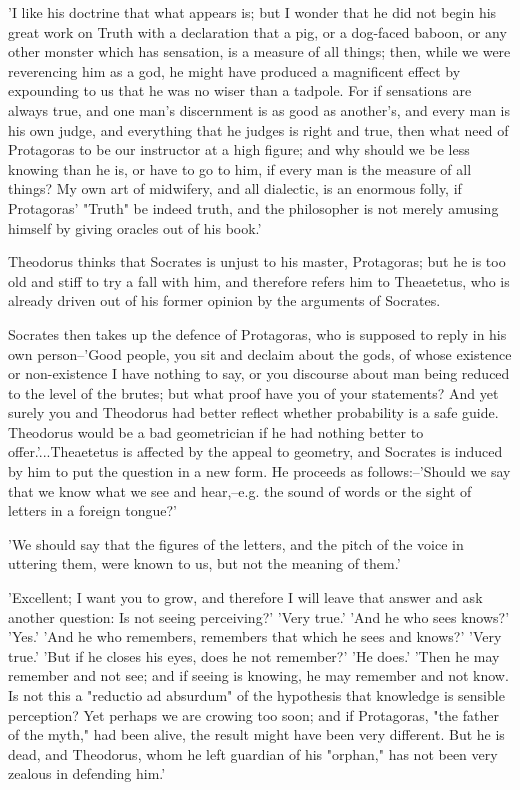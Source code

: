 'I like his doctrine that what appears is; but I wonder that he did
not begin his great work on Truth with a declaration that a pig, or a
dog-faced baboon, or any other monster which has sensation, is a measure
of all things; then, while we were reverencing him as a god, he might
have produced a magnificent effect by expounding to us that he was no
wiser than a tadpole. For if sensations are always true, and one man's
discernment is as good as another's, and every man is his own judge,
and everything that he judges is right and true, then what need of
Protagoras to be our instructor at a high figure; and why should we
be less knowing than he is, or have to go to him, if every man is the
measure of all things? My own art of midwifery, and all dialectic, is
an enormous folly, if Protagoras' "Truth" be indeed truth, and the
philosopher is not merely amusing himself by giving oracles out of his
book.'

Theodorus thinks that Socrates is unjust to his master, Protagoras; but
he is too old and stiff to try a fall with him, and therefore refers him
to Theaetetus, who is already driven out of his former opinion by the
arguments of Socrates.

Socrates then takes up the defence of Protagoras, who is supposed to
reply in his own person--'Good people, you sit and declaim about the
gods, of whose existence or non-existence I have nothing to say, or you
discourse about man being reduced to the level of the brutes; but what
proof have you of your statements? And yet surely you and Theodorus had
better reflect whether probability is a safe guide. Theodorus would be
a bad geometrician if he had nothing better to offer.'...Theaetetus is
affected by the appeal to geometry, and Socrates is induced by him to
put the question in a new form. He proceeds as follows:--'Should we say
that we know what we see and hear,--e.g. the sound of words or the sight
of letters in a foreign tongue?'

'We should say that the figures of the letters, and the pitch of the
voice in uttering them, were known to us, but not the meaning of them.'

'Excellent; I want you to grow, and therefore I will leave that answer
and ask another question: Is not seeing perceiving?' 'Very true.' 'And
he who sees knows?' 'Yes.' 'And he who remembers, remembers that which
he sees and knows?' 'Very true.' 'But if he closes his eyes, does he not
remember?' 'He does.' 'Then he may remember and not see; and if seeing
is knowing, he may remember and not know. Is not this a "reductio ad
absurdum" of the hypothesis that knowledge is sensible perception? Yet
perhaps we are crowing too soon; and if Protagoras, "the father of the
myth," had been alive, the result might have been very different. But he
is dead, and Theodorus, whom he left guardian of his "orphan," has not
been very zealous in defending him.'


